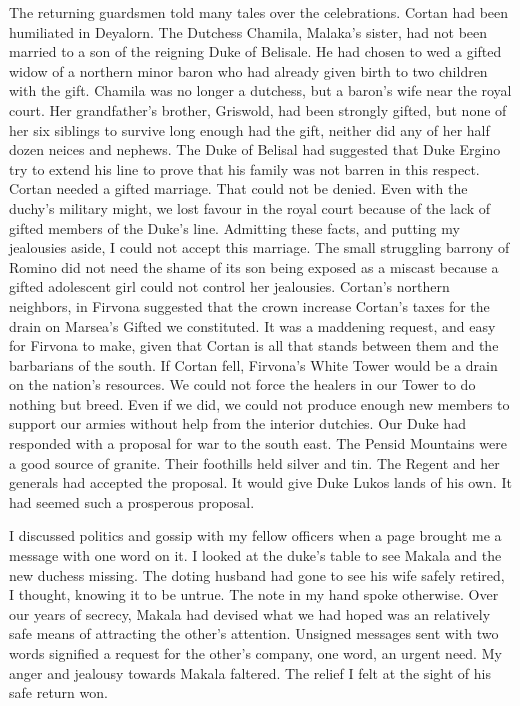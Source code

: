 \documentclass{article}
\begin{document}
The returning guardsmen told many tales over the celebrations. Cortan had been humiliated in Deyalorn. The Dutchess Chamila, Malaka's sister, had not been married to a son of the reigning Duke of Belisale. He had chosen to wed a gifted widow of a northern minor baron who had already given birth to two children with the gift. Chamila was no longer a dutchess, but a baron's wife near the royal court. Her grandfather's brother, Griswold, had been strongly gifted, but none of her six siblings to survive long enough had the gift, neither did any of her half dozen neices and nephews. The Duke of Belisal had suggested that Duke Ergino try  to extend his line to prove that his family was not barren in this respect. Cortan needed a gifted marriage. That could not be denied. Even with the duchy's military might, we lost favour in the royal court because of the lack of gifted members of the Duke's line. Admitting these facts, and putting my jealousies aside, I could not accept this marriage. The small struggling barrony of Romino did not need the shame of its son being exposed as a miscast because a gifted adolescent girl could not control her jealousies. Cortan's northern neighbors, in Firvona suggested that the crown increase Cortan's taxes for the drain on Marsea's Gifted we constituted. It was a maddening request, and easy for Firvona to make, given that Cortan is all that stands between them and the barbarians of the south. If Cortan fell, Firvona's White Tower would be a drain on the nation's resources. We could not force the healers in our Tower to do nothing but breed. Even if we did, we could not produce enough new members to support our armies without help from the interior dutchies. Our Duke had responded with a proposal for war to the south east. The Pensid Mountains were a good source of granite. Their foothills held silver and tin. The Regent and her generals had accepted the proposal. It would give Duke Lukos lands of his own. It had seemed such a prosperous proposal.

I discussed politics and gossip with my fellow officers when a page brought me a message with one word on it. I looked at the duke's table to see Makala and the new duchess missing. The doting husband had gone to see his wife safely retired, I thought, knowing it to be untrue. The note in my hand spoke otherwise. Over our years of secrecy, Makala had devised what we had hoped was an relatively safe means of attracting the other's attention. Unsigned messages sent with two words signified a request for the other's company, one word, an urgent need. My anger and jealousy towards Makala faltered. The relief I felt at the sight of his safe return won.
\end{document}
